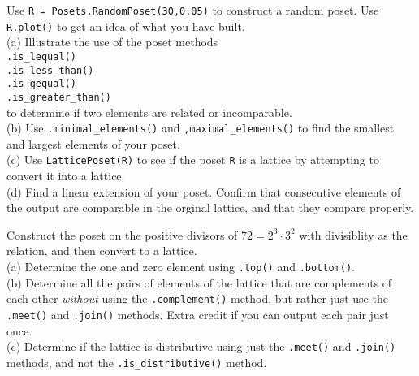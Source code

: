 \begin{sageverbatim}\end{sageverbatim}
%
%
Use  \verb?R = Posets.RandomPoset(30,0.05)? to construct a random poset.  Use \verb?R.plot()? to get an idea of what you have built.\\
%
(a) Illustrate the use of the poset methods\\
\verb?.is_lequal()?\\
\verb?.is_less_than()?\\
\verb?.is_gequal()?\\
\verb?.is_greater_than()?\\
to determine if two elements are related or incomparable.\\
%
(b) Use \verb?.minimal_elements()? and \verb?,maximal_elements()? to find the smallest and largest elements of your poset.\\
%
(c) Use \verb?LatticePoset(R)? to see if the poset \verb?R? is a lattice by attempting to convert it into a lattice.\\
%
(d) Find a linear extension of your poset.  Confirm that consecutive elements of the output are comparable in the orginal lattice, and that they compare properly.
\begin{sageverbatim}\end{sageverbatim}
%
%
Construct the poset on the positive divisors of $72=2^3\cdot 3^2$ with divisiblity as the relation, and then convert to a lattice.\\
%
(a) Determine the one and zero element using \verb?.top()? and \verb?.bottom()?.\\
%
(b) Determine all the pairs of elements of the lattice that are complements of each other \emph{without} using the \verb?.complement()? method, but rather just use the \verb?.meet()? and \verb?.join()? methods.  Extra credit if you can output each pair just once.\\
%
(c) Determine if the lattice is distributive using just the \verb?.meet()? and \verb?.join()? methods, and not the \verb?.is_distributive()? method.
\begin{sageverbatim}\end{sageverbatim}
%
%
